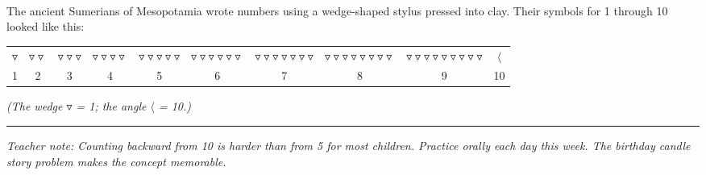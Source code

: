 \documentclass[12pt,letterpaper]{article}
\begin{document}
\vfill
{}\\[4pt]
The ancient Sumerians of Mesopotamia wrote numbers using a wedge-shaped stylus pressed into clay.
Their symbols for 1 through 10 looked like this:\\[4pt]
\begin{center}
\begin{tabular}{cccccccccc}
$\triangledown$ & $\triangledown\triangledown$ & $\triangledown\triangledown\triangledown$ &
$\triangledown\triangledown\triangledown\triangledown$ &
$\triangledown\triangledown\triangledown\triangledown\triangledown$ &
$\triangledown\triangledown\triangledown\triangledown\triangledown\triangledown$ &
$\triangledown\triangledown\triangledown\triangledown\triangledown\triangledown\triangledown$ &
$\triangledown\triangledown\triangledown\triangledown\triangledown\triangledown\triangledown\triangledown$ &
$\triangledown\triangledown\triangledown\triangledown\triangledown\triangledown\triangledown\triangledown\triangledown$ &
$\langle$\\[2pt]
1&2&3&4&5&6&7&8&9&10
\end{tabular}
\end{center}
\textit{(The wedge $\triangledown$ = 1; the angle $\langle$ = 10.)}

\vspace{4pt}\hrule\vspace{3pt}
{\footnotesize\color{gray}\textit{Teacher note: Counting backward from 10 is harder than from 5 for most children.
  Practice orally each day this week. The birthday candle story problem
  makes the concept memorable.}}
\end{document}
